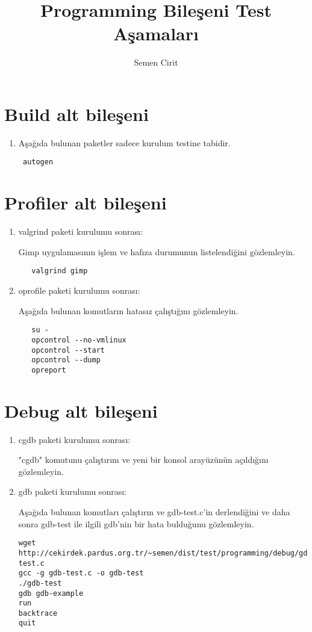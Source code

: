 \documentclass[a4paper,10pt]{article}
\title{Programming Bileşeni Test Aşamaları}
\author{Semen Cirit}
\begin{document}
\maketitle
\section{Build alt bileşeni}
\begin{enumerate}
 \item Aşağıda bulunan paketler sadece kurulum testine tabidir.
\begin{verbatim}
 autogen
\end{verbatim}

\end{enumerate}


\section{Profiler alt bileşeni}
\begin{enumerate}
 \item valgrind paketi kurulumu sonrası:

Gimp uygulamasının işlem ve hafıza durumunun listelendiğini gözlemleyin.

  \begin{verbatim}
   valgrind gimp
  \end{verbatim}


 \item oprofile paketi kurulumu sonrası:

Aşağıda bulunan komutların hatasız çalıştığını gözlemleyin.
  \begin{verbatim}
   su -
   opcontrol --no-vmlinux
   opcontrol --start
   opcontrol --dump
   opreport
  \end{verbatim}

\end{enumerate}

\section{Debug alt bileşeni}
\begin{enumerate}
\item cgdb paketi kurulumu sonrası:

"cgdb" komutunu çalıştırım ve yeni bir konsol arayüzünün açıldığını gözlemleyin.
 \item gdb paketi kurulumu sonrası:

Aşağıda bulunan komutları çalıştırın ve gdb-test.c'in derlendiğini ve daha sonra gdb-test ile ilgili gdb'nin bir hata bulduğunu gözlemleyin.
\begin{verbatim}
wget http://cekirdek.pardus.org.tr/~semen/dist/test/programming/debug/gdb-test.c
gcc -g gdb-test.c -o gdb-test
./gdb-test
gdb gdb-example
run
backtrace
quit
\end{verbatim}


\end{enumerate}
\end{document}
